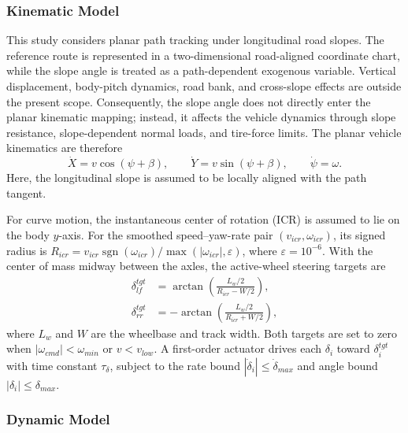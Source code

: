\documentclass{ieeeaccess}
\begin{document}
\subsubsection{Kinematic Model}

This study considers planar path tracking under longitudinal road slopes. The reference route is represented in a two-dimensional road-aligned coordinate chart, while the slope angle is treated as a path-dependent exogenous variable. Vertical displacement, body-pitch dynamics, road bank, and cross-slope effects are outside the present scope. Consequently, the slope angle does not directly enter the planar kinematic mapping; instead, it affects the vehicle dynamics through slope resistance, slope-dependent normal loads, and tire-force limits. The planar vehicle kinematics are therefore
\begin{equation}
\dot X=v\cos(\psi+\beta),\qquad
\dot Y=v\sin(\psi+\beta),\qquad
\dot\psi=\omega.
\label{eq:agv_kinematics}
\end{equation}
Here, the longitudinal slope is assumed to be locally aligned with the path tangent.

For curve motion, the instantaneous center of rotation (ICR) is assumed to lie on the body $y$-axis. For the smoothed speed--yaw-rate pair $(v_{icr},\omega_{icr})$, its signed radius is $R_{icr}=v_{icr}\operatorname{sgn}(\omega_{icr})/\max(|\omega_{icr}|,\varepsilon)$, where $\varepsilon=10^{-6}$. With the center of mass midway between the axles, the active-wheel steering targets are
\begin{equation}
\begin{aligned}
\delta_{lf}^{tgt}&=\arctan\!\left(\frac{L_w/2}{R_{icr}-W/2}\right),\\
\delta_{rr}^{tgt}&=-\arctan\!\left(\frac{L_w/2}{R_{icr}+W/2}\right),
\end{aligned}
\label{eq:agv_steering_geometry}
\end{equation}
where $L_w$ and $W$ are the wheelbase and track width. Both targets are set to zero when $|\omega_{cmd}|<\omega_{min}$ or $v<v_{low}$. A first-order actuator drives each $\delta_i$ toward $\delta_i^{tgt}$ with time constant $\tau_\delta$, subject to the rate bound $|\dot\delta_i|\leq\dot\delta_{max}$ and angle bound $|\delta_i|\leq\delta_{max}$.

\subsubsection{Dynamic Model}
\end{document}
